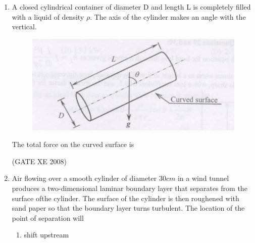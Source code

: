 \documentclass[12pt]{article}
\begin{document}
\begin{enumerate}
\begin{enumerate}
\end{enumerate}

(GATE XE 2008)
\item  A closed cylindrical container of diameter D and length L is completely filled with a liquid of density $\rho$. The axis of the cylinder makes an angle with the vertical.

\begin{figure}[H]
\centering
  \includegraphics[width=0.5\columnwidth]{figs/ass1_d_q25.png}
  \caption{}
\end{figure} 

The total force on the curved surface is

\begin{enumerate}
\end{enumerate}

(GATE XE 2008)
\item  Air flowing over a smooth cylinder of diameter $30 cm$ in a wind tunnel produces a two-dimensional laminar boundary layer that separates from the surface ofthe cylinder. The surface of the cylinder is then roughened with sand paper so that the boundary layer turns turbulent. The location of the point of separation will

\begin{enumerate}
\item  shift upstream


\end{enumerate}
\end{enumerate}
\end{document}
